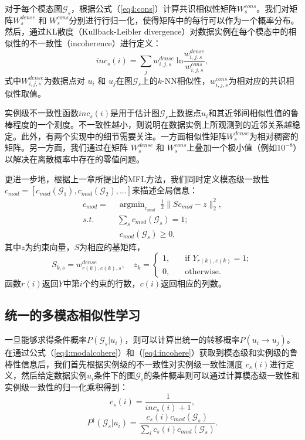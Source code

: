 对于每个模态图$\mathcal{G}_s$，根据公式（\ref{eq4:cons}）计算共识相似性矩阵${W}^{cons}_s$。我们对矩阵${W}_s^{dense}$ 和 ${W}_s^{cons}$分别进行行归一化，使得矩阵中的每行可以作为一个概率分布。然后，通过KL散度（Kullback-Leibler divergence）对数据实例在每个模态中的相似性的不一致性（incoherence）进行定义：
\begin{equation}
inc_s(i) = \sum_j {w}^{dense}_{i,j,s}\;\text{ln}\frac{{w}^{dense}_{i,j,s}}{{w}^{cons}_{i,j,s}}, 
\label{eq4:incohere}
\end{equation}
式中${W}^{dense}_{i,j,s}$为数据点对 $u_i$ 和 $u_j$在图$\mathcal{G}_s$上的$k$-NN相似性，${w}^{cons}_{i,j,s}$为相对应的共识相似性取值。

实例级不一致性函数$inc_s(i)$是用于估计图$\mathcal{G}_s$上数据点$u_i$和其近邻间相似性值的鲁棒程度的一个测度。不一致性越小，则说明在数据实例上所观测到的近邻关系越稳定。此外，有两个实现中的细节需要关注。一方面相似性矩阵${W}^{dense}_s$为相对稠密的矩阵。另一方面，我们通过在矩阵 ${W}_s^{dense}$ 和 ${W}_s^{cons}$上叠加一个极小值（例如$10^{-8}$）以解决在离散概率中存在的零值问题。

更进一步地，根据上一章所提出的MFL方法，我们同时定义模态级一致性$ {c}_{mod} = [c_{mod}(\mathcal{G}_1), c_{mod}(\mathcal{G}_2),...] $来描述全局信息：
\begin{equation}
\begin{split}
{c}_{mod} = \;&\mathop{\mathrm{argmin}}_{{c}_{mod}}\; \frac{1}{2}\|{S}{c}_{mod} - {z}  \|_2^2, \\
s.t.\quad&\sum_{s} c_{mod}(\mathcal{G}_s) = 1;\\ &\; c_{mod}(\mathcal{G}_s) \ge 0,
\end{split}
\label{eq4:modalcohere}
\end{equation}
其中$z$为约束向量，$S$为相应的基矩阵， 
\begin{equation}
{S}_{k,s} =  {w}^{dense}_{r(k), c(k), s}, \quad  {z}_k = \begin{cases}1,\quad &\text{if }  {Y}_{r(k),c(k)} =1; \\
0, \quad &\text{otherwise}.
\end{cases}
\end{equation}
函数$ r(i) $返回$Y$中第$i$个约束的行数，$ c(i) $返回相应的列数。

\subsection{统一的多模态相似性学习}
一旦能够求得条件概率$P(\mathcal{G}_s|u_i)$，则可以计算出统一的转移概率$ P(u_i\rightarrow u_j) $。在通过公式（\ref{eq4:modalcohere}）和（\ref{eq4:incohere}）获取到模态级和实例级的鲁棒性信息后，我们首先根据实例级的不一致性对实例级一致性测度 $ c_s(i) $进行定义，然后给定数据实例$u_i$条件下的图$\mathcal{G}_s$的条件概率则可以通过计算模态级一致性和实例级一致性的归一化乘积得到：
\begin{equation}
c_s(i) = \frac{1}{inc_s(i)+1}
\label{eq4:cohere},
\end{equation}
\begin{equation}
P^\dagger (\mathcal{G}_s|u_i) = \frac{c_s(i) c_{mod}(\mathcal{G}_s)}{\sum_i c_s(i) c_{mod}(\mathcal{G}_s)}
\label{eq4:Pglu}.
\end{equation}

